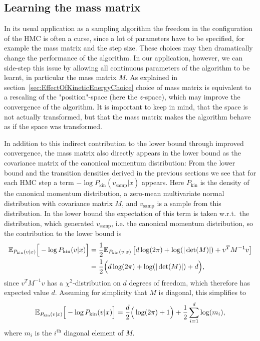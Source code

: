 \subsection{Learning the mass matrix}
\label{sec:MassMatrixChoice}
In its usual application as a sampling algorithm the freedom in the configuration of the HMC is often a curse, since a lot of parameters have to be specified, for example the mass matrix and the step size. These choices may then dramatically change the performance of the algorithm. In our application, however, we can side-step this issue by allowing all continuous parameters of the algorithm to be learnt, in particular the mass matrix $M$. As explained in section~\ref{sec:EffectOfKineticEnergyChoice} choice of mass matrix is equivalent to a rescaling of the "position"-space (here the $z$-space), which may improve the convergence of the algorithm. It is important to keep in mind, that the space is not actually transformed, but that the mass matrix makes the algorithm behave as if the space was transformed.

In addition to this indirect contribution to the lower bound through improved convergence, the mass matrix also directly appears in the lower bound as the covariance matrix of the canonical momentum distribution: From the lower bound and the transition densities derived in the previous sections we see that for each HMC step a term $-\log P_\textrm{kin}(v_\textrm{samp}|x)$ appears. Here $P_\textrm{kin}$ is the density of the canonical momentum distribution, a zero-mean multivariate normal distribution with covariance matrix $M$, and $v_\textrm{samp}$ is a sample from this distribution. In the lower bound the expectation of this term is taken w.r.t.\ the distribution, which generated $v_\textrm{samp}$, i.e. the canonical momentum distribution, so the contribution to the lower bound is
\begin{equation}
\begin{split}
\mathbb{E}_{P_\textrm{kin}(v|x)} \Big[ -\log P_\textrm{kin}(v|x) \Big] &= \frac{1}{2}\mathbb{E}_{P_\textrm{kin}(v|x)} \left[d\log(2 \pi) + \log(|\det(M)|) +  v^T M^{-1} v \right] \\
&= \frac{1}{2} \Big( d \log(2 \pi) + \log(|\det(M)|) + d \Big), 
\end{split}
\end{equation}
since $v^T M^{-1} v$ has a $\chi^2$-distribution on $d$ degrees of freedom, which therefore has expected value $d$. Assuming for simplicity that $M$ is diagonal, this simplifies to
\begin{equation}
\mathbb{E}_{P_\textrm{kin}(v|x)} \Big[ -\log P_\textrm{kin}(v|x) \Big] = \frac{d}{2} \Big( \log(2 \pi) + 1 \Big) + \frac{1}{2} \sum_{i=1}^d \log(m_i),
\end{equation}
where $m_i$ is the $i^{\textrm{th}}$ diagonal element of $M$.

